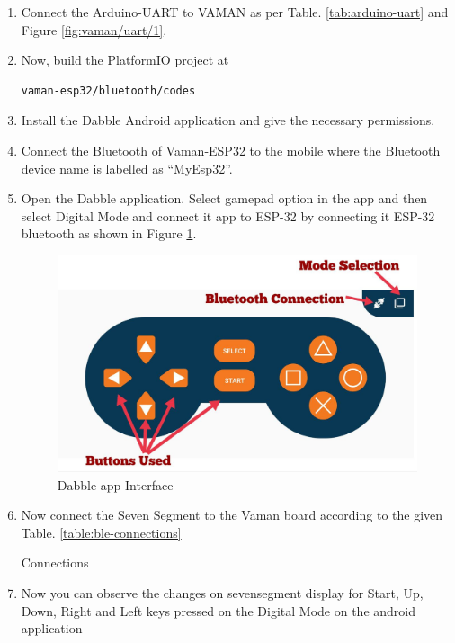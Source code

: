 \begin{enumerate}[label=\thesection.\arabic*.,ref=\thesection.\theenumi]
\item Connect the Arduino-UART to VAMAN as per Table. \ref{tab:arduino-uart} and Figure \ref{fig:vaman/uart/1}.
\item Now, build the PlatformIO project at
\begin{lstlisting}
vaman-esp32/bluetooth/codes
\end{lstlisting}
\item Install the Dabble Android application and give the necessary permissions.
\item Connect the Bluetooth of Vaman-ESP32 to the mobile where the Bluetooth 
device name is labelled as ``MyEsp32''.
\item Open the Dabble application. Select gamepad option in the app and then select Digital Mode and connect it app to ESP-32 by connecting it ESP-32 bluetooth as shown in Figure \ref{fig:ble_app}.
\begin{figure}[!ht]
\centering
\includegraphics[width=\columnwidth]{vaman-esp32/bluetooth/figs/ble_app.jpg}
\caption{Dabble app Interface}
\label{fig:ble_app}
\end{figure}
\item Now connect the Seven Segment to the Vaman board according to the given Table. \ref{table:ble-connections}
\begin{table}[!ht]
\centering

\caption{Connections}
\label{table:ble-connections}
\end{table}
\item Now you can observe the changes on sevensegment display for Start, Up, Down, Right and Left keys pressed on the Digital Mode on the android application
\end{enumerate}
